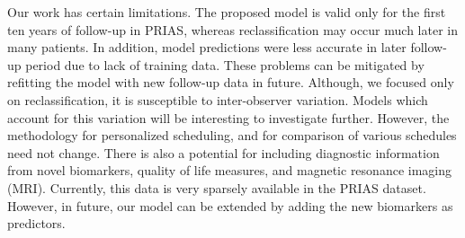 Our work has certain limitations. The proposed model is valid only for the first ten years of follow-up in PRIAS, whereas reclassification may occur much later in many patients. In addition, model predictions were less accurate in later follow-up period due to lack of training data. These problems can be mitigated by refitting the model with new follow-up data in future. Although, we focused only on reclassification, it is susceptible to inter-observer variation. Models which account for this variation \citep{coley2017prediction,balasubramanian2003estimation} will be interesting to investigate further. However, the methodology for personalized scheduling, and for comparison of various schedules need not change. There is also a potential for including diagnostic information from novel biomarkers, quality of life measures, and magnetic resonance imaging (MRI). Currently, this data is very sparsely available in the PRIAS dataset. However, in future, our model can be extended by adding the new biomarkers as predictors.